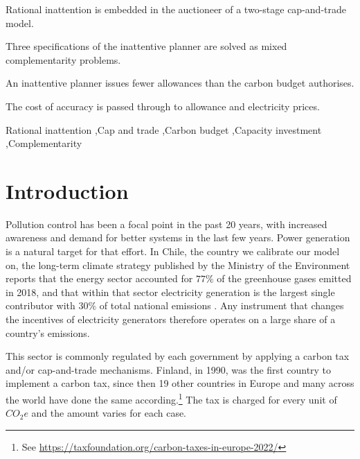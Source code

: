 \documentclass[a4paper,fleqn]{cas-dc}
\begin{document}
\begin{highlights}
\item Rational inattention is embedded in the auctioneer of a two-stage cap-and-trade model.
\item Three specifications of the inattentive planner are solved as mixed complementarity problems.
\item An inattentive planner issues fewer allowances than the carbon budget authorises.
\item The cost of accuracy is passed through to allowance and electricity prices.
\end{highlights}

\begin{keywords}
 Rational inattention \sep Cap and trade \sep Carbon budget \sep Capacity investment \sep Complementarity
\end{keywords}

\maketitle

\section{Introduction}\label{sec:intro}






Pollution control has been a focal point in the past 20 years, with increased awareness and demand for better systems in the last few years. Power generation is a natural target for that effort. In Chile, the country we calibrate our model on, the long-term climate strategy published by the Ministry of the Environment reports that the energy sector accounted for $77\%$ of the greenhouse gases emitted in 2018, and that within that sector electricity generation is the largest single contributor with $30\%$ of total national emissions \citep{gobierno_de_chile_estrategia_2021}. Any instrument that changes the incentives of electricity generators therefore operates on a large share of a country's emissions. 

This sector is commonly regulated by each government by applying a carbon tax and/or cap-and-trade mechanisms. Finland, in 1990, was the first country to implement a carbon tax, since then 19 other countries in Europe and many across the world have done the same according.\footnote{See \url{https://taxfoundation.org/carbon-taxes-in-europe-2022/}} The tax is charged for every unit of $CO_2 e$ and the amount varies for each case. 
\end{document}
